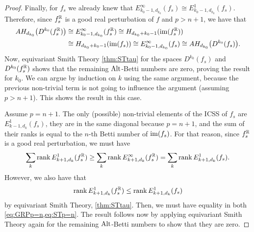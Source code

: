 \documentclass[a4paper,12pt]{amsart}
\begin{document}
\begin{proof}
Finally, for $f_s$ we already knew that $E^\infty_{k_0-1,d_{k_0}}(f_s)\cong E^1_{k_0-1,d_{k_0}}(f_s)$. Therefore, since $f_s^{\mathbb{R}}$ is a good real perturbation of $f$ and $p>n+1$, we have that
\begin{align*}
    AH_{d_{k_0}}\big(D^{k_0}(f_s^{\mathbb{R}})\big)&\cong E^\infty_{k_0-1,d_{k_0}}(f_s^{\mathbb{R}})\cong H_{d_{k_0}+k_0-1}(\operatorname{im}(f_s^{\mathbb{R}})) \\ & \cong H_{d_{k_0}+k_0-1}(\operatorname{im}(f_s))  \cong E^\infty_{k_0-1,d_{k_0}}(f_s)\cong AH_{d_{k_0}}\big(D^{k_0}(f_s)\big).
\end{align*}
Now, equivariant Smith Theory \cref{thm:STtau} for the spaces $D^{k_0}(f_s)$ and $D^{k_0}(f_s^{\mathbb{R}})$ shows that the remaining $\textnormal{Alt}$-Betti numbers are zero, proving the result for $k_0$. We can argue by induction on $k$ using the same argument, because the previous non-trivial term is not going to influence the argument (assuming $p>n+1$). This shows the result in this case.
\newline

Assume $p= n+1$. The only (possible) non-trivial elements of the ICSS of $f_s$ are $E_{k-1,d_k}^1(f_s)$, they are in the same diagonal because $p=n+1$, and the sum of their ranks is equal to the $n$-th Betti number of $\operatorname{im}(f_s)$. For that reason, since $f_s^{\mathbb{R}}$ is a good real perturbation, we must have
\begin{equation}  
\sum_k \operatorname{rank} E^1_{k+1,d_k}(f_s^{\mathbb{R}})\geq\sum_k \operatorname{rank} E^\infty_{k+1,d_k}(f_s^{\mathbb{R}})=  \sum_k \operatorname{rank} E^1_{k+1,d_k}(f_s).
\label{eq:GRPp=n}
\end{equation}
However, we also have that 
\begin{equation}
\operatorname{rank} E^1_{k+1,d_k}(f_s^{\mathbb{R}})\leq \operatorname{rank} E^1_{k+1,d_k}(f_s)
\label{eq:STp=n}
\end{equation} 
by equivariant Smith Theory, \cref{thm:STtau}. Then, we must have equality in both \cref{eq:GRPp=n,eq:STp=n}. The result follows now by applying equivariant Smith Theory again for the remaining $\textnormal{Alt}$-Betti numbers to show that they are zero.
\end{proof}
\end{document}
